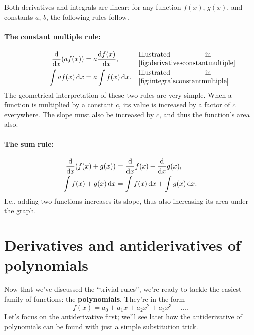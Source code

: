 Both derivatives and integrals are linear; for any function $f(x)$, $g(x)$, and constants $a$, $b$, the following rules follow.
\paragraph{The constant multiple rule:}
\begin{align}
    \odv*{(af(x))}{x} &= a\odv{f(x)}{x}, &\alc[0.3]{Illustrated in \cref{fig:derivativesconstantmultiple}}\label{eq:derivativesconstantmultiple} \\
    \int af(x)\odif{x} &= a\int f(x)\odif{x}. &\alc[0.3]{Illustrated in \cref{fig:integralsconstantmultiple}}\label{eq:integralsconstantmultiple}
\end{align}
The geometrical interpretation of these two rules are very simple. When a function is multiplied by a constant $c$, its value is increased by a factor of $c$ everywhere. The slope must also be increased by $c$, and thus the function's area also.
\paragraph{The sum rule:}
\begin{align}
    \odv*{(f(x) + g(x))}{x} &= \odv*{f(x)}{x} + \odv*{g(x)}{x}, \label{eq:derivativesumrule}\\
    \int f(x) + g(x)\odif{x} &= \int f(x)\odif{x} + \int g(x)\odif{x}. \label{eq:integralssumrule}
\end{align}
I.e., adding two functions increases its slope, thus also increasing its area under the graph.

\section{Derivatives and antiderivatives of polynomials}

Now that we've discussed the \enquote{trivial rules}, we're ready to tackle the easiest family of functions: the \textbf{polynomials}. They're in the form
\begin{equation}
    f(x) = a_0 + a_1x + a_2x^2 + a_3x^3 + \dots. \label{eq:polynomial_form}
\end{equation}
Let's focus on the antiderivative first; we'll see later how the antiderivative of polynomials can be found with just a simple substitution trick.

